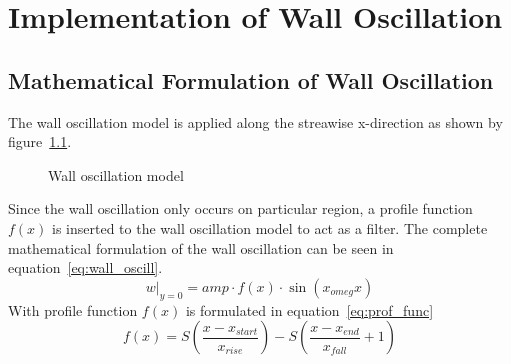 \chapter{Implementation of Wall Oscillation}
\section{Mathematical Formulation of Wall Oscillation}
The wall oscillation model is applied along the streawise x-direction as shown by figure~\ref{fig:wall_oscill}.
\begin{figure}[h]
  \centering
  \caption{Wall oscillation model}
  \label{fig:wall_oscill}
\end{figure}
Since the wall oscillation only occurs on particular region, a profile function $f(x)$ is inserted to the wall oscillation model to act as a filter. The complete mathematical formulation of the wall oscillation can be seen in equation~\ref{eq:wall_oscill}.
\begin{equation}\label{eq:wall_oscill}
  w|_{y=0} = amp\cdot f(x)\cdot\sin (x_{omeg}x)
\end{equation}
With profile function $f(x)$ is formulated in equation~\ref{eq:prof_func}
\begin{equation}\label{eq:prof_func}
  f(x)=S\left(\frac{x-x_{start}}{x_{rise}}\right)-S\left(\frac{x-x_{end}}{x_{fall}}+1\right)
\end{equation}

